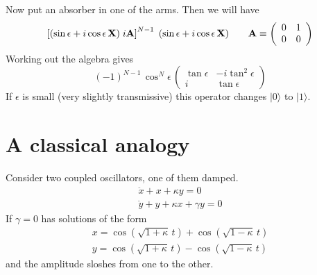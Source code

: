 \documentclass[12pt,aps,prb,preprint]{revtex4}
\def\ket#1{|#1\rangle}
\def\X{{\bf X}}
\def\A{{\bf A}}
\begin{document}
Now put an absorber in one of the arms.  Then we will have
\begin{equation}
     \left[ (\sin\epsilon + i\cos\epsilon\,\X) \; i\A \right]^{N-1} \;
     (\sin\epsilon + i\cos\epsilon\,\X)
  \qquad
  \A \equiv \left( \begin{array}{cc} 0 & 1 \\ 0 & 0 \end{array} \right)
\end{equation}
Working out the algebra gives
\begin{equation}
(-1)^{N-1} \, \cos^N\!\epsilon \,
\left( \begin{array}{cc} \tan\epsilon & -i\tan^2\epsilon \\
                         i            & \tan\epsilon 
       \end{array} \right)
\end{equation}
If $\epsilon$ is small (very slightly transmissive) this operator
changes $\ket0$ to $\ket1$.

\section{A classical analogy}

Consider two coupled oscillators, one of them damped.
\begin{equation}
\begin{array}{l}
\ddot x + x + \kappa y = 0 \\
\ddot y + y + \kappa x + \gamma y = 0
\end{array}
\end{equation}
If $\gamma=0$ has solutions of the form
\begin{equation}
\begin{array}{l}
x = \cos(\sqrt{1+\kappa}\,t) + \cos(\sqrt{1-\kappa}\,t)  \\
y = \cos(\sqrt{1+\kappa}\,t) - \cos(\sqrt{1-\kappa}\,t)
\end{array}
\end{equation}
and the amplitude sloshes from one to the other.
\end{document}
